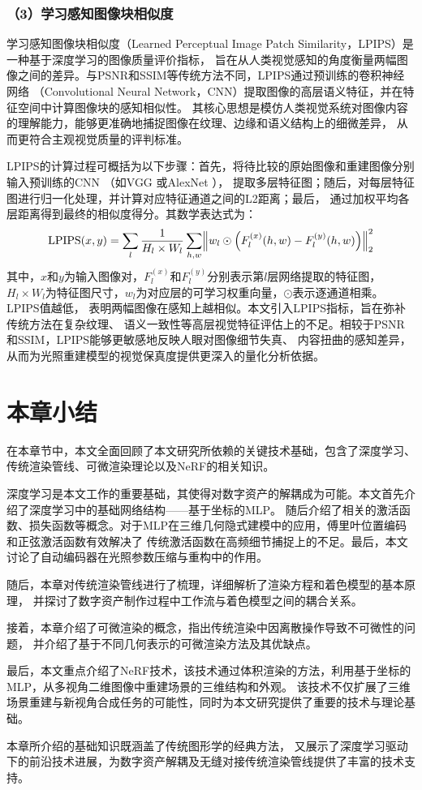 \subsubsection*{（3）学习感知图像块相似度} 

学习感知图像块相似度（Learned Perceptual Image Patch Similarity，LPIPS）是一种基于深度学习的图像质量评价指标，
旨在从人类视觉感知的角度衡量两幅图像之间的差异。与PSNR和SSIM等传统方法不同，LPIPS通过预训练的卷积神经网络
（Convolutional Neural Network，CNN）提取图像的高层语义特征，并在特征空间中计算图像块的感知相似性。
其核心思想是模仿人类视觉系统对图像内容的理解能力，能够更准确地捕捉图像在纹理、边缘和语义结构上的细微差异，
从而更符合主观视觉质量的评判标准。

LPIPS的计算过程可概括为以下步骤：首先，将待比较的原始图像和重建图像分别输入预训练的CNN
（如VGG \cite{journals/corr/SimonyanZ14a}或AlexNet \cite{NIPS2012_c399862d}），
提取多层特征图；随后，对每层特征图进行归一化处理，并计算对应特征通道之间的L2距离；最后，
通过加权平均各层距离得到最终的相似度得分。其数学表达式为：
\begin{equation}\label{eq:lpips}
  \mathrm{LPIPS}(x,y)=
  \sum_{l}\frac{1}{H_{l}\times W_{l}}
  \sum_{h,w} \Bigl \Vert w_{l} \odot \Bigl(F_{l}^{(x)}(h,w)-F_{l}^{(y)}(h,w) \Bigr) \Bigr \Vert_{2}^{2}
\end{equation}
其中，$x$和$y$为输入图像对，$F_{l}^{(x)}$和$F_{l}^{(y)}$分别表示第$l$层网络提取的特征图，
$H_{l}\times W_{l}$为特征图尺寸，$w_{l}$为对应层的可学习权重向量，$\odot$表示逐通道相乘。LPIPS值越低，
表明两幅图像在感知上越相似。本文引入LPIPS指标，旨在弥补传统方法在复杂纹理、
语义一致性等高层视觉特征评估上的不足。相较于PSNR和SSIM，LPIPS能够更敏感地反映人眼对图像细节失真、
内容扭曲的感知差异，从而为光照重建模型的视觉保真度提供更深入的量化分析依据。

\section{本章小结}
在本章节中，本文全面回顾了本文研究所依赖的关键技术基础，包含了深度学习、传统渲染管线、可微渲染理论以及NeRF的相关知识。

深度学习是本文工作的重要基础，其使得对数字资产的解耦成为可能。本文首先介绍了深度学习中的基础网络结构——基于坐标的MLP。
随后介绍了相关的激活函数、损失函数等概念。对于MLP在三维几何隐式建模中的应用，傅里叶位置编码和正弦激活函数有效解决了
传统激活函数在高频细节捕捉上的不足。最后，本文讨论了自动编码器在光照参数压缩与重构中的作用。

随后，本章对传统渲染管线进行了梳理，详细解析了渲染方程和着色模型的基本原理，
并探讨了数字资产制作过程中工作流与着色模型之间的耦合关系。

接着，本章介绍了可微渲染的概念，指出传统渲染中因离散操作导致不可微性的问题，
并介绍了基于不同几何表示的可微渲染方法及其优缺点。

最后，本文重点介绍了NeRF技术，该技术通过体积渲染的方法，利用基于坐标的MLP，从多视角二维图像中重建场景的三维结构和外观。
该技术不仅扩展了三维场景重建与新视角合成任务的可能性，同时为本文研究提供了重要的技术与理论基础。

本章所介绍的基础知识既涵盖了传统图形学的经典方法，
又展示了深度学习驱动下的前沿技术进展，为数字资产解耦及无缝对接传统渲染管线提供了丰富的技术支持。

